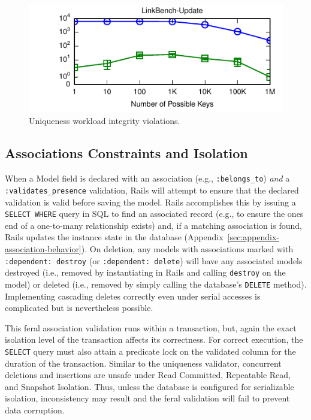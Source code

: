 \begin{figure}
\begin{adjustwidth}{-2em}{}
\includegraphics[width=1.08\columnwidth]{figs/pk-workload-linkbench-upd-violations.pdf}\vspace{-1em}
\end{adjustwidth}
\caption{Uniqueness workload integrity violations.}
\label{fig:pk-workload}
\end{figure}


\subsection{Associations Constraints and Isolation}

When a Model field is declared with an association (e.g.,
\texttt{:belongs\_to}) \textit{and} a \texttt{:validates\_presence}
validation, Rails will attempt to ensure that the declared validation
is valid before saving the model. Rails accomplishes this by issuing a
\texttt{SELECT WHERE} query in SQL to find an associated record (e.g.,
to ensure the ones end of a one-to-many relationship exists) and, if a
matching association is found, Rails updates the instance state in the
database (Appendix~\ref{sec:appendix-association-behavior}). On
deletion, any models with associations marked with \texttt{:dependent:
  destroy} (or \texttt{:dependent: delete}) will have any associated
models destroyed (i.e., removed by instantiating in Rails and calling
\texttt{destroy} on the model) or deleted (i.e., removed by simply
calling the database's \texttt{DELETE} method). Implementing cascading
deletes correctly even under serial accesses is complicated but is
nevertheless possible.

This feral association validation runs within a transaction, but,
again the exact isolation level of the transaction affects its
correctness. For correct execution, the \texttt{SELECT} query must
also attain a predicate lock on the validated column for the duration
of the transaction. Similar to the uniqueness validator, concurrent
deletions and insertions are unsafe under Read Committed, Repeatable
Read, and Snapshot Isolation. Thus, unless the database is configured
for serializable isolation, inconsistency may result and the feral
validation will fail to prevent data corruption.

